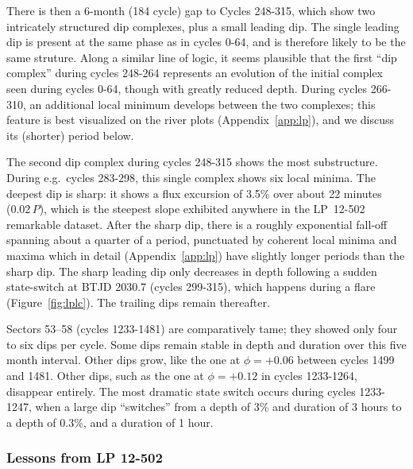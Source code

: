 \documentclass[11pt,twocolumn,tighten]{aastex63}
\begin{document}
There is then a 6-month (184 cycle) gap to Cycles 248-315, which show
two intricately structured dip complexes, plus a small leading dip.
The single leading dip is present at the same phase as in
cycles 0-64, and is therefore likely to be the same struture.  Along a
similar line of logic, it seems plausible that the first ``dip
complex'' during cycles 248-264 represents an evolution of the initial
complex seen during cycles 0-64, though with greatly reduced depth.
During cycles 266-310, an additional local minimum develops between
the two complexes; this feature is best visualized on the river plots
(Appendix~\ref{app:lp}), and we discuss its (shorter) period below.

The second dip complex during cycles 248-315 shows the most
substructure.  During e.g.~cycles 283-298, this single complex shows
six local minima.  The deepest dip is sharp: it shows a flux excursion
of 3.5\% over about 22 minutes (0.02\,$P$), which is the steepest
slope exhibited anywhere in the LP~12-502 remarkable dataset.  After
the sharp dip, there is a roughly exponential fall-off spanning about
a quarter of a period, punctuated by coherent local minima and maxima
which in detail (Appendix~\ref{app:lp}) have slightly longer periods
than the sharp dip.  The sharp leading dip only decreases in depth
following a sudden state-switch at BTJD 2030.7 (cycles 299-315), which
happens during a flare (Figure~\ref{fig:lplc}).  The trailing dips
remain thereafter.

Sectors 53--58 (cycles 1233-1481) are comparatively tame; they showed
only four to six dips per cycle.  Some dips remain stable in depth and
duration over this five month interval.  Other dips grow, like the one
at $\phi = +0.06$ between cycles 1499 and 1481.  Other dips, such as
the one at $\phi = +0.12$ in cycles 1233-1264, disappear entirely.
The most dramatic state switch occurs during cycles 1233-1247, when a
large dip ``switches'' from a depth of 3\% and duration of 3 hours to
a depth of 0.3\%, and a duration of 1 hour.


\subsubsection{Lessons from LP 12-502}
\end{document}
